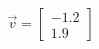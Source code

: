 \documentclass[preview]{standalone}
\begin{document}
\begin{align*}
\vec{v}=\begin{bmatrix}-1.2\\1.9\end{bmatrix}
\end{align*}
\end{document}
